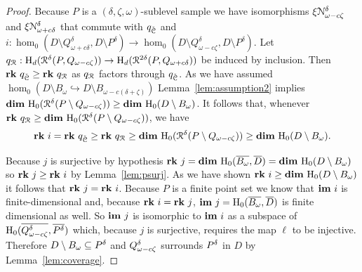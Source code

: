 \begin{proof}

  Because $P$ is a $(\delta, \zeta, \omega)$-sublevel sample we have isomorphisms $\xi\mathcal{N}_{\omega-c\zeta}^\delta$ and $\xi\mathcal{N}_{\omega+c\delta}^\delta$ that commute with $q_{\check{\mathcal{C}}}$ and $i : \hom_0(D\setminus Q_{\omega+c\delta}^\delta, D\setminus P^\delta)\to \hom_0(D\setminus Q_{\omega-c\zeta}^\delta, D\setminus P^\delta)$.
  Let $q_{\mathcal{R}} : \mathrm{H}_d(\mathcal{R}^{\delta}(P, Q_{\omega-c\zeta}))\to\mathrm{H}_d(\mathcal{R}^{2\delta}(P, Q_{\omega+c\delta}))$ be induced by inclusion.
  Then $\mathbf{rk}~q_{\check{\mathcal{C}}} \geq\mathbf{rk}~q_{\mathcal{R}}$ as $q_{\mathcal{R}}$ factors through $q_{\check{\mathcal{C}}}$.
  As we have assumed $\hom_0(D\setminus B_\omega\hookrightarrow D\setminus B_{\omega-c(\delta+\zeta)})$ Lemma~\ref{lem:assumption2} implies $\mathbf{dim}~\mathrm{H}_0(\mathcal{R}^\delta(P\setminus Q_{\omega-c\zeta}))\geq \mathbf{dim}~\mathrm{H}_0(D\setminus B_\omega)$.
  It follows that, whenever $\mathbf{rk}~q_{\mathcal{R}} \geq \mathbf{dim}~\mathrm{H}_0(\mathcal{R}^\delta(P\setminus Q_{\omega-c\zeta}))$, we have
  \[ \mathbf{rk}~i = \mathbf{rk}~q_{\check{\mathcal{C}}} \geq \mathbf{rk}~q_{\mathcal{R}} \geq \mathbf{dim}~\mathrm{H}_0(\mathcal{R}^\delta(P\setminus Q_{\omega-c\zeta})) \geq \mathbf{dim}~\mathrm{H}_0(D\setminus B_\omega).\]

  Because $j$ is surjective by hypothesis $\mathbf{rk}~j = \mathbf{dim}~\mathrm{H}_0(\overline{B_{\omega}},\overline{D}) = \mathbf{dim}~\mathrm{H}_0(D\setminus B_\omega)$ so $\mathbf{rk}~j\geq \mathbf{rk}~i$ by Lemma~\ref{lem:psurj}.
  As we have shown $\mathbf{rk}~i\geq \mathbf{dim}~\mathrm{H}_0(D\setminus B_\omega)$ it follows that $\mathbf{rk}~j = \mathbf{rk}~i$.
  Because $P$ is a finite point set we know that $\mathbf{im}~i$ is finite-dimensional and, because $\mathbf{rk}~i = \mathbf{rk}~j$, $\mathbf{im}~j=\mathrm{H}_0(\overline{B_{\omega}}, \overline{D})$ is finite dimensional as well.
  So $\mathbf{im}~j$ is isomorphic to $\mathbf{im}~i$ as a subspace of $\mathrm{H}_0(\overline{Q_{\omega - c\zeta}^{\delta}}, \overline{P^{\delta}})$ which, because $j$ is surjective, requires the map $\ell$ to be injective.
  Therefore $D\setminus B_\omega\subseteq P^{\delta}$ and $Q_{\omega - c\zeta}^{\delta}$ surrounds $P^{\delta}$ in $D$ by Lemma~\ref{lem:coverage}.
\end{proof}
